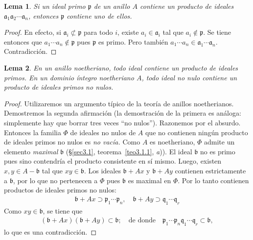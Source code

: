 \documentclass[oneside,bibtotoc,leqno,spanish]{amsbook}
\newcommand{\idl}[1]{\mathfrak{#1}}
\numberwithin{equation}{section}
\theoremstyle{defi}
\theoremstyle{note}
\newtheorem{lemma}{Lema}
\theoremstyle{rem}
\numberwithin{theorem}{section}
\numberwithin{proposition}{section}
\numberwithin{definition}{section}
\numberwithin{lemma}{section}
\numberwithin{corollary}{section}
\numberwithin{example}{section}
\numberwithin{footnote}{section}%
\begin{document}
\begin{lemma}\label{lem3.3.2}
Si un ideal primo $\idl{p}$ de un anillo $A$ contiene un producto de ideales
$\idl{a}_{1}\idl{a}_{2}\cdots\idl{a}_{n}$, entonces $\idl{p}$ contiene uno de ellos.
\end{lemma}

\begin{proof}
En efecto, si $\idl{a}_{i}\not\subset\idl{p}$ para todo $i$, existe $a_{i}\in\idl{a}_{i}$ tal que
$a_{i}\notin\idl{p}$. Se tiene entonces que $a_{1}\cdots a_{n}\notin\idl{p}$ pues $\idl{p}$
es primo. Pero tambi\'en $a_{1}\cdots a_{n}\in\idl{a}_{1}\cdots\idl{a}_{n}$. Contradicci\'on.
\end{proof}

\begin{lemma}\label{lem3.3.3}
En un anillo noetheriano, todo ideal contiene un producto de ideales primos. En un dominio \'integro noetheriano
$A$, todo ideal no nulo contiene un producto de ideales primos no nulos.
\end{lemma}

\begin{proof}
Utilizaremos un argumento t\'ipico de la teor\'ia de anillos noetherianos. Demostremos la segunda
afirmaci\'on (la demostraci\'on de la primera es an\'aloga: simplemente hay que borrar tres
veces ``no nulos''). Razonemos por el absurdo. Entonces la familia $\Phi$ de ideales no nulos de $A$ que
no contienen ning\'un producto de ideales primos no nulos es {\em no vac\'ia.} Como $A$ es noetheriano,
$\Phi$ admite un elemento {\em maximal} $\idl{b}$ (\S\ref{sec3.1}, teorema~\ref{teo3.1.1}, {\itshape a})).
El ideal $\idl{b}$ no es primo pues
sino contendr\'ia el producto consistente en s\'i mismo. Luego, existen $x, y\in A-\idl{b}$ tal que
$xy\in\idl{b}$. Los ideales $\idl{b}+Ax$ y $\idl{b}+Ay$ contienen estrictamente a $\idl{b}$, por lo que
no pertenecen a $\Phi$ pues $\idl{b}$ es maximal en $\Phi$. Por lo tanto contienen productos de ideales
primos no nulos:
\begin{gather*}
\idl{b}+Ax\supset\idl{p}_{1}\cdots\idl{p}_{n},\quad\idl{b}+Ay\supset\idl{q}_{1}\cdots\idl{q}_{r}
\end{gather*}
Como $xy\in\idl{b}$, se tiene que
\begin{gather*}
(\idl{b}+Ax)(\idl{b}+Ay)\subset\idl{b};\quad\text{de donde}\quad\idl{p}_{1}\cdots\idl{p}_{n}\idl{q}_{1}\cdots
\idl{q}_{r}\subset\idl{b},
\end{gather*}
lo que es una contradicci\'on.
\end{proof}
\end{document}
